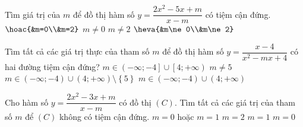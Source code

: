 \begin{ex}
	Tìm giá trị của $m$ để đồ thị hàm số $y=\dfrac{2x^2-5x+m}{x-m}$ có tiệm cận đứng.
	\choice
	{$\hoac{&m=0\\&m=2}$}
	{$m\ne 0$}
	{$m\ne 2$}
	{\True $\heva{&m\ne 0\\&m\ne 2}$}
\end{ex} 

\begin{ex}%
	Tìm tất cả các giá trị thực của tham số $m$ để đồ thị hàm số $y=\dfrac{x-4}{x^2-mx+4}$ có hai đường tiệm cận đứng?
	\choice
	{$m \in \left (-\infty;-4\right] \cup \left [4;+\infty \right )$}
	{$m \ne 5$}
	{\True $m \in \left (-\infty;-4\right) \cup \left (4;+\infty \right ) \setminus \left \{5\right \}$}
	{$m \in \left (-\infty;-4\right) \cup \left (4;+\infty \right )$}
\end{ex}

\begin{ex}%
	Cho hàm số $ y = \dfrac{2x^2-3x+m}{x-m} $ có đồ thị $ (C) $. Tìm tất cả các giá trị của tham số $ m $ để $ (C) $ không có tiệm cận đứng.
	\choice
	{\True $ m = 0 $ hoặc $ m = 1 $}
	{$ m = 2 $}
	{$ m = 1 $}
	{$ m = 0 $}
\end{ex}


